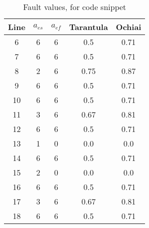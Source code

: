 

\begin{table}[!h]
\centering
\begin{tabular}{|c|c|c|c|c|}
\hline
Line & $a_{es}$ & $a_{ef}$ & Tarantula & Ochiai \\
\hline
6 & 6 & 6 & 0.5 & 0.71 \\
7 & 6 & 6 & 0.5 & 0.71 \\
8 & 2 & 6 & 0.75 & 0.87 \\
9 & 6 & 6 & 0.5 & 0.71 \\
10 & 6 & 6 & 0.5 & 0.71 \\
11 & 3 & 6 & 0.67 & 0.81 \\
12 & 6 & 6 & 0.5 & 0.71 \\
13 & 1 & 0 & 0.0 & 0.0 \\
14 & 6 & 6 & 0.5 & 0.71 \\
15 & 2 & 0 & 0.0 & 0.0 \\
16 & 6 & 6 & 0.5 & 0.71 \\
17 & 3 & 6 & 0.67 & 0.81 \\
18 & 6 & 6 & 0.5 & 0.71\\
\hline
\end{tabular}
\caption{Fault values, for code snippet}
\label{tab: sfl}
\end{table}
